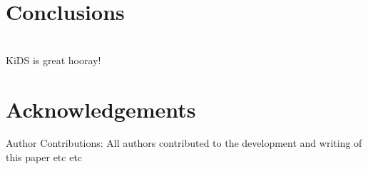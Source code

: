 \documentclass[useAMS,usenatbib,times,letter,amssymb]{mn2e}
\newcommand{\red}[1]{{\color{red}{#1}}}
\begin{document}
\section{Conclusions}
\red{KK}\\
KiDS is great hooray!






\section{Acknowledgements}

{\small Author Contributions: All authors contributed to the development and writing of this paper etc etc}



\label{lastpage}
\end{document}
